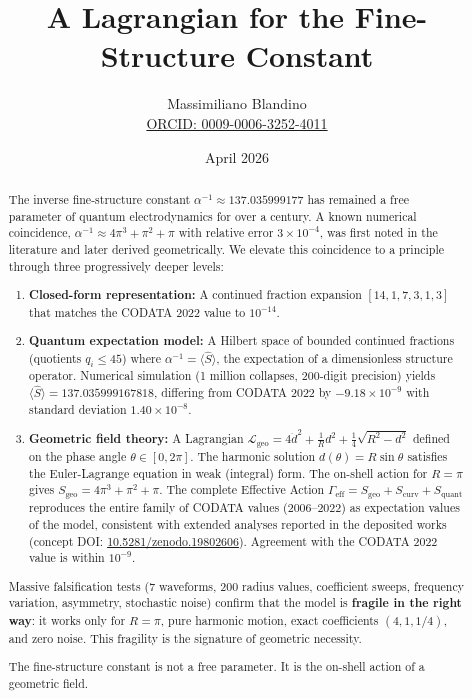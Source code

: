 \documentclass[12pt]{article}
\title{A Lagrangian for the Fine-Structure Constant}
\author{Massimiliano Blandino \\ 
\href{https://orcid.org/0009-0006-3252-4011}{ORCID: 0009-0006-3252-4011}}
\date{April 2026}
\begin{document}
\maketitle

\begin{abstract}
The inverse fine-structure constant $\alpha^{-1} \approx 137.035999177$ has remained a free parameter of quantum electrodynamics for over a century. A known numerical coincidence, $\alpha^{-1} \approx 4\pi^3 + \pi^2 + \pi$ with relative error $3\times10^{-4}$, was first noted in the literature and later derived geometrically. We elevate this coincidence to a principle through three progressively deeper levels:

\begin{enumerate}
    \item \textbf{Closed-form representation:} A continued fraction expansion $[14,1,7,3,1,3]$ that matches the CODATA 2022 value to $10^{-14}$.
    
    \item \textbf{Quantum expectation model:} A Hilbert space of bounded continued fractions (quotients $q_i \le 45$) where $\alpha^{-1} = \langle \hat S \rangle$, the expectation of a dimensionless structure operator. Numerical simulation (1 million collapses, 200-digit precision) yields $\langle \hat S \rangle = 137.035999167818$, differing from CODATA 2022 by $-9.18\times10^{-9}$ with standard deviation $1.40\times10^{-8}$.
    
    \item \textbf{Geometric field theory:} A Lagrangian $\mathcal{L}_{\text{geo}} = 4\dot{d}^2 + \frac{1}{R}d^2 + \frac{1}{4}\sqrt{R^2-d^2}$ defined on the phase angle $\theta \in [0,2\pi]$. The harmonic solution $d(\theta) = R\sin\theta$ satisfies the Euler-Lagrange equation in weak (integral) form. The on-shell action for $R = \pi$ gives $S_{\text{geo}} = 4\pi^3 + \pi^2 + \pi$. The complete Effective Action $\Gamma_{\text{eff}} = S_{\text{geo}} + S_{\text{curv}} + S_{\text{quant}}$ reproduces the entire family of CODATA values (2006–2022) as expectation values of the model, consistent with extended analyses reported in the deposited works (concept DOI: \href{https://doi.org/10.5281/zenodo.19802606}{10.5281/zenodo.19802606}). Agreement with the CODATA 2022 value is within $10^{-9}$.
\end{enumerate}

Massive falsification tests (7 waveforms, 200 radius values, coefficient sweeps, frequency variation, asymmetry, stochastic noise) confirm that the model is \textbf{fragile in the right way}: it works only for $R = \pi$, pure harmonic motion, exact coefficients $(4,1,1/4)$, and zero noise. This fragility is the signature of geometric necessity.

The fine-structure constant is not a free parameter. It is the on-shell action of a geometric field.
\end{abstract}
\end{document}
